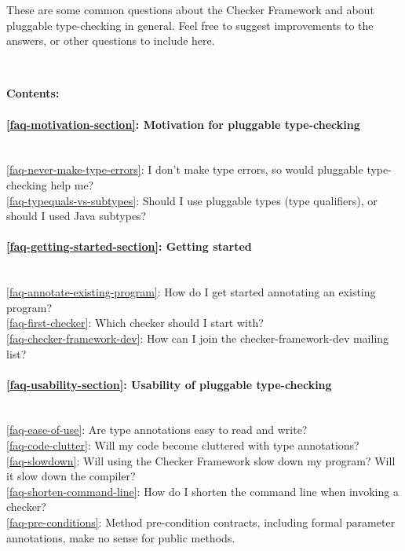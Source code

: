 \htmlhr
{}

These are some common questions about the Checker Framework and about
pluggable type-checking in general.  Feel free to suggest improvements to
the answers, or other questions to include here.


~

\newcommand{\faqtocpara}[1]{\paragraph{#1} ~}


\noindent
\textbf{Contents:}

\faqtocpara{\ref{faq-motivation-section}: Motivation for pluggable type-checking}
\\ \ref{faq-never-make-type-errors}: I don't make type errors, so would pluggable type-checking help me?
\\ \ref{faq-typequals-vs-subtypes}: Should I use pluggable types (type qualifiers), or should I used Java subtypes?

\faqtocpara{\ref{faq-getting-started-section}: Getting started}
\\ \ref{faq-annotate-existing-program}: How do I get started annotating an existing program?
\\ \ref{faq-first-checker}: Which checker should I start with?
\\ \ref{faq-checker-framework-dev}: How can I join the checker-framework-dev mailing list?

\faqtocpara{\ref{faq-usability-section}: Usability of pluggable type-checking}
\\ \ref{faq-ease-of-use}: Are type annotations easy to read and write?
\\ \ref{faq-code-clutter}: Will my code become cluttered with type annotations?
\\ \ref{faq-slowdown}: Will using the Checker Framework slow down my program?  Will it slow down the compiler?
\\ \ref{faq-shorten-command-line}: How do I shorten the command line when invoking a checker?
\\ \ref{faq-pre-conditions}: Method pre-condition contracts, including formal parameter annotations, make no sense for public methods.

